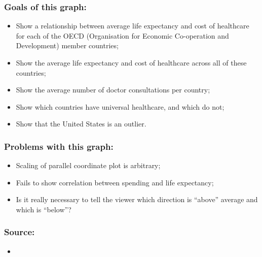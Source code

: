 \documentclass{beamer}
\begin{document}
\begin{frame}
    \frametitle{Goals of this graph:}
    \begin{itemize}
        \item Show a relationship between average life expectancy and cost of healthcare for each of the OECD (Organisation for Economic Co-operation and Development) member countries;
        \item Show the average life expectancy and cost of healthcare across all of these countries;
        \item Show the average number of doctor consultations per country;
        \item Show which countries have universal healthcare, and which do not;
        \item Show that the United States is an outlier.
    \end{itemize}
\end{frame}

\begin{frame}
    \frametitle{Problems with this graph:}
    \begin{itemize}
        \item Scaling of parallel coordinate plot is arbitrary;
        \item Fails to show correlation between spending and life expectancy;
        \item Is it really necessary to tell the viewer which direction is ``above'' average and which is ``below''?
    \end{itemize}
\end{frame}

{
    \begin{frame}[plain] \end{frame}
}

\begin{frame}
    \frametitle{Source:}
    \begin{itemize}
        \item 
    \end{itemize}
\end{frame}
\end{document}
